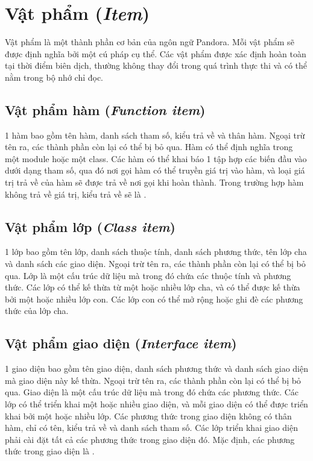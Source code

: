 \section{Vật phẩm (\textit{Item})}

\regexitem

Vật phẩm là một thành phần cơ bản của ngôn ngữ Pandora. Mỗi vật phẩm sẽ được định nghĩa bởi một cú pháp cụ thể. Các vật phẩm được xác định hoàn toàn tại thời điểm biên dịch, thường không thay đổi trong quá trình thực thi và có thể nằm trong bộ nhớ chỉ đọc.

\subsection{Vật phẩm hàm (\textit{Function item})}          

\regexfunitem

1 hàm bao gồm tên hàm, danh sách tham số, kiểu trả về và thân hàm. Ngoại trừ tên ra, các thành phần còn lại có thể bị bỏ qua. Hàm có thể định nghĩa trong một module hoặc một class. Các hàm có thể khai báo 1 tập hợp các biến đầu vào dưới dạng tham số, qua đó nơi gọi hàm có thể truyền giá trị vào hàm, và loại giá trị trả về của hàm sẽ được trả về nơi gọi khi hoàn thành. Trong trường hợp hàm không trả về giá trị, kiểu trả về sẽ là .

\subsection{Vật phẩm lớp (\textit{Class item})}

\regexclassitem

1 lớp bao gồm tên lớp, danh sách thuộc tính, danh sách phương thức, tên lớp cha và danh sách các giao diện. Ngoại trừ tên ra, các thành phần còn lại có thể bị bỏ qua. Lớp là một cấu trúc dữ liệu mà trong đó chứa các thuộc tính và phương thức. Các lớp có thể kế thừa từ một hoặc nhiều lớp cha, và có thể được kế thừa bởi một hoặc nhiều lớp con. Các lớp con có thể mở rộng hoặc ghi đè các phương thức của lớp cha.

\subsection{Vật phẩm giao diện (\textit{Interface item})}

\regexinterfaceitem

1 giao diện bao gồm tên giao diện, danh sách phương thức và danh sách giao diện mà giao diện này kế thừa. Ngoại trừ tên ra, các thành phần còn lại có thể bị bỏ qua. Giao diện là một cấu trúc dữ liệu mà trong đó chứa các phương thức. Các lớp có thể triển khai một hoặc nhiều giao diện, và mỗi giao diện có thể được triển khai bởi một hoặc nhiều lớp. Các phương thức trong giao diện không có thân hàm, chỉ có tên, kiểu trả về và danh sách tham số. Các lớp triển khai giao diện phải cài đặt tất cả các phương thức trong giao diện đó. Mặc định, các phương thức trong giao diện là .

